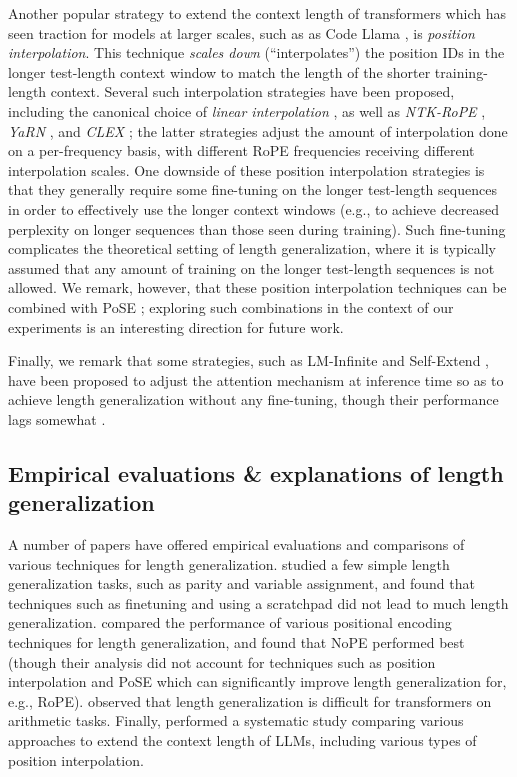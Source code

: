 \documentclass{article}
\begin{document}
Another popular strategy to extend the context length of transformers which has seen traction for models at larger scales, such as as Code Llama \cite{roziere_code_2024}, is \emph{position interpolation}. This technique \emph{scales down} (``interpolates'') the position IDs in the longer test-length context window to match the length of the shorter training-length context. Several such interpolation strategies have been proposed, including the canonical choice of \emph{linear interpolation} \cite{chen_extending_2023}, as well as \emph{NTK-RoPE} \cite{emozilla_dynamically_2023}, \emph{YaRN} \cite{peng_yarn_2023}, and \emph{CLEX} \cite{chen_clex_2024}; the latter strategies adjust the amount of interpolation done on a per-frequency basis, with different RoPE frequencies receiving different interpolation scales. One downside of these position interpolation strategies is that they generally require some fine-tuning on the longer test-length sequences in order to effectively use the longer context windows (e.g., to achieve decreased perplexity on longer sequences than those seen during training). Such fine-tuning complicates the theoretical setting of length generalization, where it is typically assumed that any amount of training on the longer test-length sequences is not allowed. We remark, however, that these position interpolation techniques can be combined with PoSE \cite{zhu_pose_2024,wu_never_2024}; exploring such combinations in the context of our experiments is an interesting direction for future work.

Finally, we remark that some strategies, such as LM-Infinite \cite{han_lminfinite_2024} and Self-Extend \cite{jin_llm_2024}, have been proposed to adjust the attention mechanism at inference time so as to achieve length generalization without any fine-tuning, though their performance lags somewhat \cite{lu_controlled_2024}. 





\subsection{Empirical evaluations \& explanations of length generalization}
A number of papers have offered empirical evaluations and comparisons of various techniques for length generalization. \citet{anil_exploring_2022} studied a few simple length generalization tasks, such as parity and variable assignment, and found that techniques such as finetuning and using a scratchpad did not lead to much length generalization. 
\citet{kazemnejad_impact_2023} compared the performance of various positional encoding techniques for length generalization, and found that NoPE performed best (though their analysis did not account for techniques such as position interpolation and PoSE which can significantly improve length generalization for, e.g., RoPE).  \citet{lee_teaching_2023} observed that length generalization is difficult for transformers on arithmetic tasks. 
Finally, \citet{lu_controlled_2024} performed a systematic study comparing various approaches to extend the context length of LLMs, including various types of position interpolation. 
\end{document}
